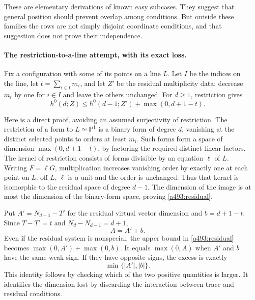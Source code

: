 \documentclass[11pt]{article}
\begin{document}
These are elementary derivations of known easy subcases. They suggest that
general position should prevent overlap among conditions. But outside these
families the rows are not simply disjoint coordinate conditions, and that
suggestion does not prove their independence.

\paragraph{The restriction-to-a-line attempt, with its exact loss.}
Fix a configuration with some of its points on a line $L$. Let $I$ be the
indices on the line, let $t=\sum_{i\in I}m_i$, and let $Z'$ be the
residual multiplicity data: decrease $m_i$ by one for $i\in I$ and leave
the others unchanged. For $d\geq1$, restriction gives
\begin{equation}\label{a493:residual}
 h^0(d;Z)\leq h^0(d-1;Z')+\max(0,d+1-t).
\end{equation}

Here is a direct proof, avoiding an assumed surjectivity of restriction.
The restriction of a form to $L\simeq\mathbb P^1$ is a binary form of
degree $d$, vanishing at the distinct selected points to orders at least
$m_i$. Such forms form a space of dimension $\max(0,d+1-t)$, by
factoring the required distinct linear factors. The kernel of restriction
consists of forms divisible by an equation $\ell$ of $L$. Writing
$F=\ell G$, multiplication increases vanishing order by exactly one at
each point on $L$; off $L$, $\ell$ is a unit and the order is unchanged.
Thus that kernel is isomorphic to the residual space of degree $d-1$.
The dimension of the image is at most the dimension of the binary-form
space, proving \eqref{a493:residual}.

Put $A'=N_{d-1}-T'$ for the residual virtual vector dimension and
$b=d+1-t$. Since $T-T'=t$ and $N_d-N_{d-1}=d+1$,
\begin{equation}\label{a493:addvirtual}
                              A=A'+b.
\end{equation}
Even if the residual system is nonspecial, the upper bound in
\eqref{a493:residual} becomes $\max(0,A')+\max(0,b)$. It equals
$\max(0,A)$ when $A'$ and $b$ have the same weak sign. If they have
opposite signs, the excess is exactly
\begin{equation}\label{a493:slack}
                           \min\{|A'|,|b|\}.
\end{equation}
This identity follows by checking which of the two positive quantities is
larger. It identifies the dimension lost by discarding the interaction
between trace and residual conditions.
\end{document}
